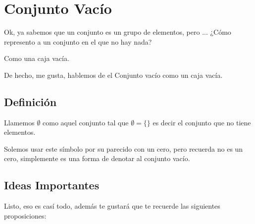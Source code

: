 \documentclass[12pt, fleqn]{report}                             %
\begin{document}
        \clearpage
        \section{Conjunto Vacío}
                
            Ok, ya sabemos que un conjunto es un grupo de elementos, pero ...
            ¿Cómo represento a un conjunto en el que no hay nada?

            Como una caja vacía.

            De hecho, me gusta, hablemos de el Conjunto vacío como un caja vacía.

            \subsection{Definición}

                Llamemos $\emptyset$ como aquel conjunto tal que $\emptyset = \{ \}$ es decir el
                conjunto que no tiene elementos.

                Solemos usar este símbolo por su parecido con un cero, pero recuerda no es un cero,
                simplemente
                es una forma de denotar al conjunto vacío.


            \subsection{Ideas Importantes}

                Listo, eso es casí todo, además te gustará que te recuerde las siguientes
                proposiciones:
\end{document}
